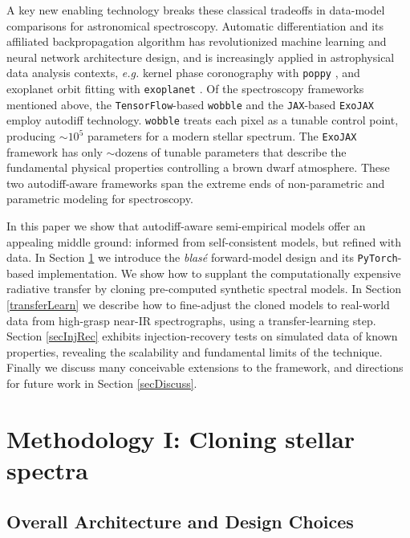 \documentclass[modern]{aastex631}
\begin{document}
A key new enabling technology breaks these classical tradeoffs in data-model comparisons for astronomical spectroscopy.  Automatic differentiation \citep[``autodiff'',][]{2015arXiv150205767G} and its affiliated backpropagation algorithm has revolutionized machine learning and neural network architecture design, and is increasingly applied in astrophysical data analysis contexts, \emph{e.g.} kernel phase coronography with \texttt{poppy} \citep{2021ApJ...907...40P}, and exoplanet orbit fitting with \texttt{exoplanet} \citep{2021JOSS....6.3285F}.  Of the spectroscopy frameworks mentioned above, the \texttt{TensorFlow}-based \citep{tensorflow2015-whitepaper} \texttt{wobble} and the \texttt{JAX}-based \citep{jax2018github} \texttt{ExoJAX} employ autodiff technology.  \texttt{wobble} treats each pixel as a tunable control point, producing $\sim10^5$ parameters for a modern stellar spectrum.  The \texttt{ExoJAX} framework has only $\sim$dozens of tunable parameters that describe the fundamental physical properties controlling a brown dwarf atmosphere.  These two autodiff-aware frameworks span the extreme ends of non-parametric and parametric modeling for spectroscopy.

In this paper we show that autodiff-aware semi-empirical models offer an appealing middle ground: informed from self-consistent models, but refined with data.  In Section \ref{methodology} we introduce the \emph{blas\'e} forward-model design and its \texttt{PyTorch}-based \cite{2019arXiv191201703P} implementation.  We show how to supplant the computationally expensive radiative transfer by cloning pre-computed synthetic spectral models.  In Section \ref{transferLearn} we describe how to fine-adjust the cloned models to real-world data from high-grasp near-IR spectrographs, using a transfer-learning step.  Section \ref{secInjRec} exhibits injection-recovery tests on simulated data of known properties, revealing the scalability and fundamental limits of the technique.  Finally we discuss many conceivable extensions to the framework, and directions for future work in Section \ref{secDiscuss}.


\section{Methodology I: Cloning stellar spectra}\label{methodology}

\subsection{Overall Architecture and Design Choices}
\end{document}
